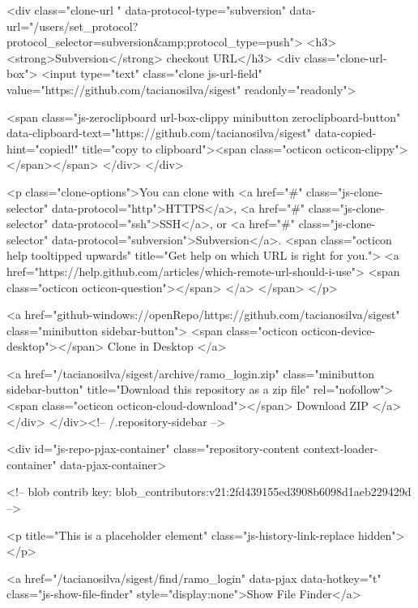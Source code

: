   

<div class="clone-url "
  data-protocol-type="subversion"
  data-url="/users/set_protocol?protocol_selector=subversion&amp;protocol_type=push">
  <h3><strong>Subversion</strong> checkout URL</h3>
  <div class="clone-url-box">
    <input type="text" class="clone js-url-field"
           value="https://github.com/tacianosilva/sigest" readonly="readonly">

    <span class="js-zeroclipboard url-box-clippy minibutton zeroclipboard-button" data-clipboard-text="https://github.com/tacianosilva/sigest" data-copied-hint="copied!" title="copy to clipboard"><span class="octicon octicon-clippy"></span></span>
  </div>
</div>


<p class="clone-options">You can clone with
      <a href="#" class="js-clone-selector" data-protocol="http">HTTPS</a>,
      <a href="#" class="js-clone-selector" data-protocol="ssh">SSH</a>,
      or <a href="#" class="js-clone-selector" data-protocol="subversion">Subversion</a>.
  <span class="octicon help tooltipped upwards" title="Get help on which URL is right for you.">
    <a href="https://help.github.com/articles/which-remote-url-should-i-use">
    <span class="octicon octicon-question"></span>
    </a>
  </span>
</p>


  <a href="github-windows://openRepo/https://github.com/tacianosilva/sigest" class="minibutton sidebar-button">
    <span class="octicon octicon-device-desktop"></span>
    Clone in Desktop
  </a>

              <a href="/tacianosilva/sigest/archive/ramo_login.zip"
                 class="minibutton sidebar-button"
                 title="Download this repository as a zip file"
                 rel="nofollow">
                <span class="octicon octicon-cloud-download"></span>
                Download ZIP
              </a>
            </div>
        </div><!-- /.repository-sidebar -->

        <div id="js-repo-pjax-container" class="repository-content context-loader-container" data-pjax-container>
          


<!-- blob contrib key: blob_contributors:v21:2fd439155ed3908b6098d1aeb229429d -->

<p title="This is a placeholder element" class="js-history-link-replace hidden"></p>

<a href="/tacianosilva/sigest/find/ramo_login" data-pjax data-hotkey="t" class="js-show-file-finder" style="display:none">Show File Finder</a>

